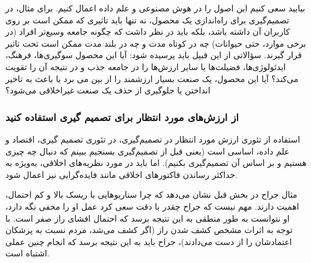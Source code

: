 بیایید سعی کنیم این اصول را در هوش مصنوعی و علم داده اعمال کنیم.
برای مثال، در تصمیم‌گیری برای راه‌اندازی یک محصول، نه تنها باید تاثیری که ممکن است بر روی کاربران آن داشته باشد، بلکه باید در نظر داشت که چگونه جامعه وسیع‌تر افراد (در برخی موارد، حتی حیوانات) چه در کوتاه مدت و چه در بلند مدت ممکن است تحت تاثیر قرار گیرند.
سؤالاتی از این قبیل باید پرسیده شود: آیا این محصول سوگیری‌ها، فرهنگ، ایدئولوژی‌ها، فضیلت‌ها یا سایر ارزش‌ها را در جامعه جذب و در نتیجه آن را تقویت می‌کند؟ آیا این محصول، یک صنعت بسیار ارزشمند را از بین می برد یا باعث به تاخیر انداختن یا جلوگیری از حذف یک صنعت غیراخلاقی می‌شود؟
\newline
\newline


{
\subsubsection*{از ارزش‌های مورد انتظار برای تصمیم گیری استفاده کنید}
\label{subsubsec:از ارزش‌های مورد انتظار برای تصمیم گیری استفاده کنید}
استفاده از تئوری ارزش مورد انتظار در تصمیم‌گیری، در تئوری تصمیم گیری، اقتصاد و علم داده، اساسی است (یعنی قبل از تصمیم‌گیری بسنجیم ببینم که دنبال چه چیزی هستیم و بر اساس آن تصمیم‌گیری بکنیم).
اما باید در مورد نظریه‌های اخلاقی، به‌ویژه به حداکثر رساندن فاکتورهای اخلاقی مانند فایده‌گرایی نیز اعمال شود.
}
مثال جراح در بخش قبل نشان می‌دهد که چرا سناریوهایی با ریسک بالا و کم احتمال، اهمیت دارند.
مهم نیست که جراح چقدر با دقت سعی کرد عمل او را مخفی نگه دارد، او نتوانست به طور منطقی به این نتیجه برسد که احتمال افشای راز صفر است.
با توجه به اثرات مشخص کشف شدن راز (اگر کشف می‌شد، مردم نسبت به پزشکان اعتمادشان را از دست می‌دادند)، جراح باید به این نتیجه برسد که انجام چنین عملی اشتباه است.

